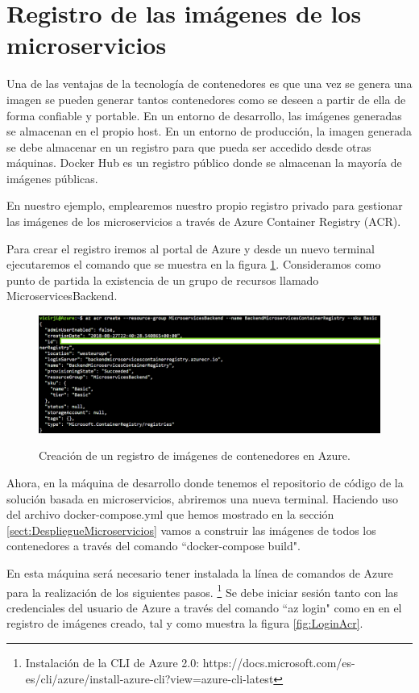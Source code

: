 \documentclass[11pt,spanish,listoffigures]{tfgetsinf}
\begin{document}
\section{Registro de las imágenes de los microservicios}

Una de las ventajas de la tecnología de contenedores es que una vez se genera una imagen se pueden generar tantos contenedores como se deseen a partir de ella de forma confiable y portable. \cite{Matthias} En un entorno de desarrollo, las imágenes generadas se almacenan en el propio host. En un entorno de producción, la imagen generada se debe almacenar en un registro para que pueda ser accedido desde otras máquinas. Docker Hub es un registro público donde se almacenan la mayoría de imágenes públicas.

En nuestro ejemplo, emplearemos nuestro propio registro privado para gestionar las imágenes de los microservicios a través de Azure Container Registry (ACR). \cite{DelaTorre2018}

Para crear el registro iremos al portal de Azure y desde un nuevo terminal ejecutaremos el comando que se muestra en la figura \ref{fig:CreateACR}. Consideramos como punto de partida la existencia de un grupo de recursos llamado MicroservicesBackend.

\begin{figure}[h]
\centering
\includegraphics[scale=0.50]{CreateACR} \label{fig:CreateACR}
\caption{Creación de un registro de imágenes de contenedores en Azure.}
\end{figure}

Ahora, en la máquina de desarrollo donde tenemos el repositorio de código de la solución basada en microservicios, abriremos una nueva terminal. Haciendo uso del archivo docker-compose.yml que hemos mostrado en la sección \ref{sect:DespliegueMicroservicios}  vamos a construir las imágenes de todos los contenedores a través del comando ``docker-compose build".

En esta máquina será necesario tener instalada la línea de comandos de Azure para la realización de los siguientes pasos. \footnote{Instalación de la CLI de Azure 2.0: https://docs.microsoft.com/es-es/cli/azure/install-azure-cli?view=azure-cli-latest} Se debe iniciar sesión tanto con las credenciales del usuario de Azure a través del comando ``az login" como en en el registro de imágenes creado, tal y como muestra la figura \ref{fig:LoginAcr}.
\end{document}
